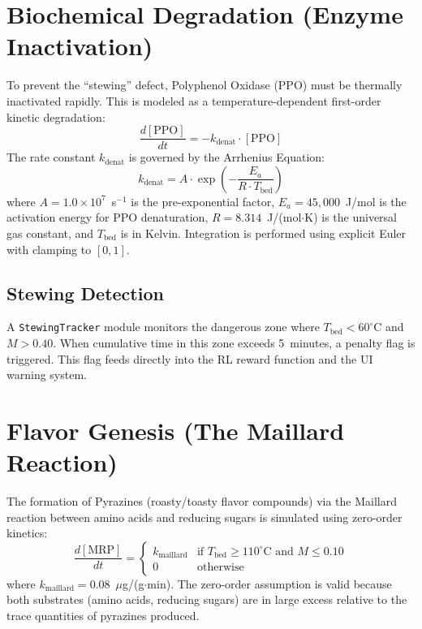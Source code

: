 ﻿\documentclass[12pt, a4paper]{report}
\begin{document}
\section{Biochemical Degradation (Enzyme Inactivation)}
To prevent the ``stewing'' defect, Polyphenol Oxidase (PPO) must be thermally inactivated rapidly. This is modeled as a temperature-dependent first-order kinetic degradation:
\begin{equation}
\frac{d[\text{PPO}]}{dt} = -k_{\text{denat}} \cdot [\text{PPO}]
\end{equation}
The rate constant $k_{\text{denat}}$ is governed by the Arrhenius Equation:
\begin{equation}
k_{\text{denat}} = A \cdot \exp\left(-\frac{E_a}{R \cdot T_{\text{bed}}}\right)
\label{eq:arrhenius}
\end{equation}
where $A = 1.0 \times 10^7$~s$^{-1}$ is the pre-exponential factor, $E_a = 45{,}000$~J/mol is the activation energy for PPO denaturation, $R = 8.314$~J/(mol$\cdot$K) is the universal gas constant, and $T_{\text{bed}}$ is in Kelvin. Integration is performed using explicit Euler with clamping to $[0, 1]$.

\subsection{Stewing Detection}
A \texttt{StewingTracker} module monitors the dangerous zone where $T_{\text{bed}} < 60^\circ$C and $M > 0.40$. When cumulative time in this zone exceeds 5~minutes, a penalty flag is triggered. This flag feeds directly into the RL reward function and the UI warning system.

\section{Flavor Genesis (The Maillard Reaction)}
The formation of Pyrazines (roasty/toasty flavor compounds) via the Maillard reaction between amino acids and reducing sugars is simulated using zero-order kinetics:
\begin{equation}
\frac{d[\text{MRP}]}{dt} = \begin{cases} k_{\text{maillard}} & \text{if } T_{\text{bed}} \geq 110^\circ\text{C and } M \leq 0.10 \\ 0 & \text{otherwise} \end{cases}
\end{equation}
where $k_{\text{maillard}} = 0.08$~$\mu$g/(g$\cdot$min). The zero-order assumption is valid because both substrates (amino acids, reducing sugars) are in large excess relative to the trace quantities of pyrazines produced.
\end{document}
